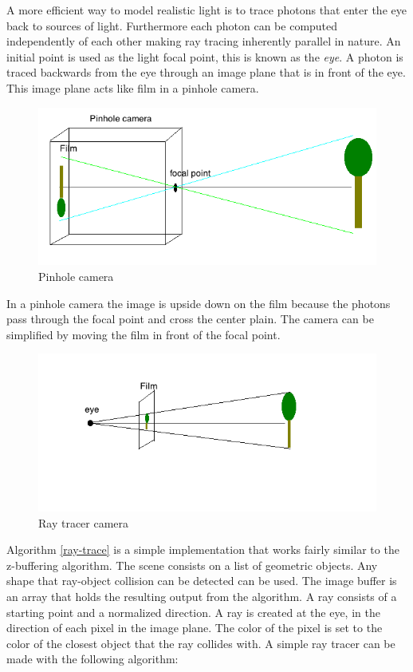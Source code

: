 \documentclass[12pt,a4paper,oneside]{article}
\begin{document}
A more efficient way to model realistic light is to trace photons that enter the eye back to sources of light.  Furthermore each photon can be computed independently of each other making ray tracing inherently parallel in nature.  An initial point is used as the light focal point, this is known as the \textit{eye}.  A photon is traced backwards from the eye through an image plane that is in front of the eye.  This image plane acts like film in a pinhole camera.  

\begin{figure}[H]
\includegraphics[scale=0.6]{pineholecamera.png} 
\caption{Pinhole camera}
\label{pinhole-camera}
\end{figure}

In a pinhole camera the image is upside down on the film because the photons pass through the focal point and cross the center plain.  The camera can be simplified by moving the film in front of the focal point.

 \begin{figure}[H]
\includegraphics[scale=0.6]{raycamera.png} 
\caption{Ray tracer camera}
\label{ray-camera}
\end{figure}

Algorithm \ref{ray-trace} is a simple implementation that works fairly similar to the z-buffering algorithm.  The scene consists on a list of geometric  objects.  Any shape that ray-object collision can be detected can be used.  The image buffer is an array that holds the resulting output from the algorithm.  A ray consists of a starting point and a normalized direction.  A ray is created at the eye, in the direction of each pixel in the image plane.  The color of the pixel is set to the color of the closest object that the ray collides with.  A simple ray tracer can be made with the following algorithm:
\end{document}
